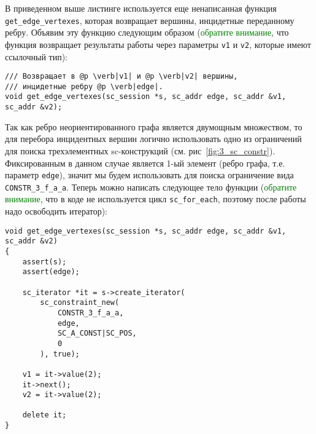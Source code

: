 В приведенном выше листинге используется еще ненаписанная функция
\lstinline|get_edge_vertexes|, которая возвращает вершины, инцидетные
переданному ребру. Объявим эту функцию следующим образом
(\textcolor{green}{обратите внимание}, что функция возвращает результаты
работы через параметры \lstinline|v1| и \lstinline|v2|, которые имеют
ссылочный тип):
\begin{lstlisting}[texcl]
/// Возвращает в @p \verb|v1| и @p \verb|v2| вершины,
/// инцидетные ребру @p \verb|edge|.
void get_edge_vertexes(sc_session *s, sc_addr edge, sc_addr &v1, sc_addr &v2);
\end{lstlisting}

Так как ребро неориентированного графа является двумощным множеством,
то для перебора инцидентных вершин логично использовать одно из
ограничений для поиска трехэлементных sc-конструкций
(см. рис~\ref{fig:3_sc_constr}). Фиксированным в данном случае
является 1-ый элемент (ребро графа, т.е. параметр \lstinline|edge|),
значит мы будем использовать для поиска ограничение вида
\lstinline|CONSTR_3_f_a_a|. Теперь можно написать следующее тело
функции (\textcolor{green}{обратите внимание}, что в коде не
используется цикл \lstinline|sc_for_each|, поэтому после работы надо
освободить итератор):
\begin{lstlisting}[texcl]
void get_edge_vertexes(sc_session *s, sc_addr edge, sc_addr &v1, sc_addr &v2)
{
    assert(s);
    assert(edge);

    sc_iterator *it = s->create_iterator(
        sc_constraint_new(
            CONSTR_3_f_a_a,
            edge,
            SC_A_CONST|SC_POS,
            0
        ), true);

    v1 = it->value(2);
    it->next();
    v2 = it->value(2);

    delete it;
}
\end{lstlisting}

